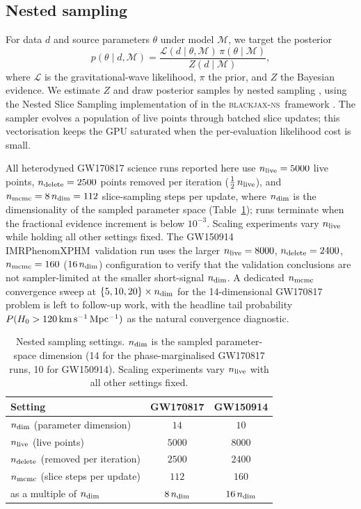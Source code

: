 \documentclass[usenatbib]{mnras}
\newcommand{\kmsmpc}{\ensuremath{\,\rm km\,s^{-1}\,Mpc^{-1}}\xspace}
\newcommand{\hzero}{\ensuremath{H_{0}}\xspace}
\newcommand{\XPHM}{IMRPhenomXPHM\xspace}
\newcommand{\bjns}{\textsc{blackjax-ns}\xspace}
\begin{document}
\subsection{Nested sampling}

For data $d$ and source parameters $\theta$ under model $\mathcal{M}$, we target the posterior
\begin{equation}
p(\theta\mid d,\mathcal{M}) = \frac{\mathcal{L}(d\mid\theta,\mathcal{M})\,\pi(\theta\mid\mathcal{M})}{Z(d\mid\mathcal{M})},
\end{equation}
where $\mathcal{L}$ is the gravitational-wave likelihood, $\pi$ the prior, and $Z$ the Bayesian evidence. We estimate $Z$ and draw posterior samples by nested sampling \citep{Skilling2006Nested}, using the Nested Slice Sampling implementation of \citet{Yallup2026BlackjaxNS} in the \bjns\ framework \citep{BlackJAX}. The sampler evolves a population of live points through batched slice updates; this vectorisation keeps the GPU saturated when the per-evaluation likelihood cost is small.

All heterodyned GW170817 science runs reported here use $n_{\rm live}=5000$ live points, $n_{\rm delete}=2500$ points removed per iteration ($\tfrac12\,n_{\rm live}$), and $n_{\rm mcmc}=8\,n_{\rm dim}=112$ slice-sampling steps per update, where $n_{\rm dim}$ is the dimensionality of the sampled parameter space (Table~\ref{tab:sampler}); runs terminate when the fractional evidence increment is below $10^{-3}$. Scaling experiments vary $n_{\rm live}$ while holding all other settings fixed. The GW150914 \XPHM\ validation run uses the larger $n_{\rm live}=8000$, $n_{\rm delete}=2400$, $n_{\rm mcmc}=160$ ($16\,n_{\rm dim}$) configuration to verify that the validation conclusions are not sampler-limited at the smaller short-signal $n_{\rm dim}$. A dedicated $n_{\rm mcmc}$ convergence sweep at $\{5,10,20\}\times n_{\rm dim}$ for the 14-dimensional GW170817 problem is left to follow-up work, with the headline tail probability $P(\hzero>120\kmsmpc)$ as the natural convergence diagnostic.

\begin{table}
  \centering
  \caption{Nested sampling settings. $n_{\rm dim}$ is the sampled parameter-space dimension (14 for the phase-marginalised GW170817 runs, 10 for GW150914). Scaling experiments vary $n_{\rm live}$ with all other settings fixed.}
  \label{tab:sampler}
  \begin{tabular}{lcc}
    \toprule
    Setting & GW170817 & GW150914 \\
    \midrule
    $n_{\rm dim}$ (parameter dimension)      & $14$ & $10$ \\
    $n_{\rm live}$ (live points)             & $5000$ & $8000$ \\
    $n_{\rm delete}$ (removed per iteration) & $2500$ & $2400$ \\
    $n_{\rm mcmc}$ (slice steps per update)  & $112$ & $160$ \\
    \quad as a multiple of $n_{\rm dim}$     & $8\,n_{\rm dim}$ & $16\,n_{\rm dim}$ \\
    \bottomrule
  \end{tabular}
\end{table}
\end{document}
